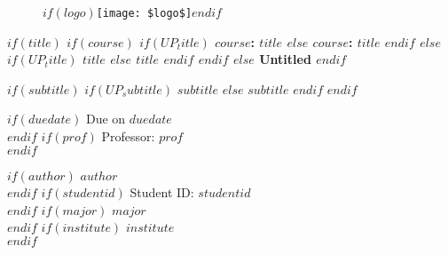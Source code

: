 \documentclass[$if(fontsize)$$fontsize$,$endif$$if(lang)$$babel-lang$,$endif$$if(papersize)$$papersize$paper,$endif$$for(classoption)$$classoption$$sep$,$endfor$]{article}
\begin{document}


\begin{titlepage}

    \begin{center}
           \begin{figure}
			\centering
			$if(logo)$\texttt{[image: \$logo\$]}$endif$
		\end{figure}

       \vspace*{1cm}

        \LARGE{
            \textbf{
                $if(title)$
                    $if(course)$
                        $if(UP_title)$
                            \uppercase{$course$: $title$}
                        $else$
                            $course$: $title$
                    $endif$
                    $else$
                        $if(UP_title)$
                            \uppercase{$title$}
                        $else$
                            $title$
                        $endif$
                    $endif$
                $else$
                    Untitled
                $endif$
            }
        }


       \large{ $if(subtitle)$ $if(UP_subtitle)$ \uppercase{$subtitle$} $else$ $subtitle$ $endif$ $endif$ }

        $if(duedate)$
            \Large{Due on $duedate$} \\
        $endif$
        $if(prof)$
            \Large{Professor: $prof$} \\
        $endif$


        \vspace{10cm}

        $if(author)$ \Large{\textbf{$author$}}  \\ $endif$
        $if(studentid)$ \Large{Student ID: $studentid$} \\ $endif$
        $if(major)$ \Large{$major$}  \\ $endif$
        $if(institute)$ \Large{$institute$}  \\ $endif$


\end{center}
\end{titlepage}
\end{document}
